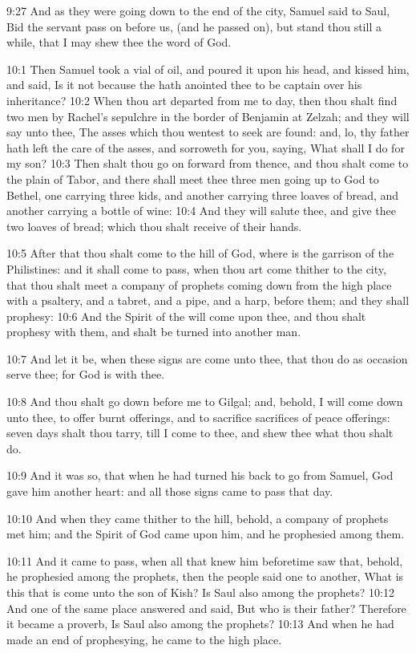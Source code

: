 9:27 And as they were going down to the end of the city, Samuel said
to Saul, Bid the servant pass on before us, (and he passed on), but
stand thou still a while, that I may shew thee the word of God.

10:1 Then Samuel took a vial of oil, and poured it upon his head, and
kissed him, and said, Is it not because the \LORD hath anointed thee to
be captain over his inheritance?  10:2 When thou art departed from me
to day, then thou shalt find two men by Rachel's sepulchre in the
border of Benjamin at Zelzah; and they will say unto thee, The asses
which thou wentest to seek are found: and, lo, thy father hath left
the care of the asses, and sorroweth for you, saying, What shall I do
for my son?  10:3 Then shalt thou go on forward from thence, and thou
shalt come to the plain of Tabor, and there shall meet thee three men
going up to God to Bethel, one carrying three kids, and another
carrying three loaves of bread, and another carrying a bottle of wine:
10:4 And they will salute thee, and give thee two loaves of bread;
which thou shalt receive of their hands.

10:5 After that thou shalt come to the hill of God, where is the
garrison of the Philistines: and it shall come to pass, when thou art
come thither to the city, that thou shalt meet a company of prophets
coming down from the high place with a psaltery, and a tabret, and a
pipe, and a harp, before them; and they shall prophesy: 10:6 And the
Spirit of the \LORD will come upon thee, and thou shalt prophesy with
them, and shalt be turned into another man.

10:7 And let it be, when these signs are come unto thee, that thou do
as occasion serve thee; for God is with thee.

10:8 And thou shalt go down before me to Gilgal; and, behold, I will
come down unto thee, to offer burnt offerings, and to sacrifice
sacrifices of peace offerings: seven days shalt thou tarry, till I
come to thee, and shew thee what thou shalt do.

10:9 And it was so, that when he had turned his back to go from
Samuel, God gave him another heart: and all those signs came to pass
that day.

10:10 And when they came thither to the hill, behold, a company of
prophets met him; and the Spirit of God came upon him, and he
prophesied among them.

10:11 And it came to pass, when all that knew him beforetime saw that,
behold, he prophesied among the prophets, then the people said one to
another, What is this that is come unto the son of Kish? Is Saul also
among the prophets?  10:12 And one of the same place answered and
said, But who is their father? Therefore it became a proverb, Is Saul
also among the prophets?  10:13 And when he had made an end of
prophesying, he came to the high place.

